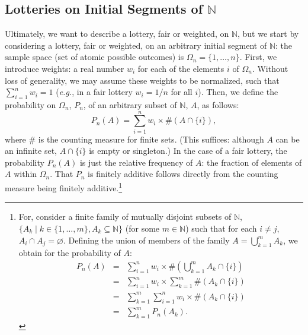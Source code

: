 \subsection{Lotteries on Initial Segments of $\mathbb{N}$}
Ultimately, we want to describe a lottery, fair or weighted, on $\mathbb{N}$, but we start by considering a lottery, fair or weighted, on an arbitrary initial segment of $\mathbb{N}$: the sample space (set of atomic possible outcomes) is $\Omega_n=\{1,\ldots,n\}$. First, we introduce weights: a real number $w_i$ for each of the elements $i$ of $\Omega_n$. Without loss of generality, we may assume these weights to be normalized, such that $\sum_{i=1}^{n} w_i=1$ (\textit{e.g.}, in a fair lottery $w_i=1/n$ for all $i$). Then, we define the probability on $\Omega_n$, $P_n$, of an arbitrary subset of $\mathbb{N}$, $A$, as follows:
$$ P_n(A)= \sum_{i=1}^{n}w_i \times \#(A \cap \{i\}), $$
where $\#$ is the counting measure for finite sets. (This suffices: although $A$ can be an infinite set, $A \cap \{i\}$ is empty or singleton.)
In the case of a fair lottery, the probability $P_n(A)$ is just the relative frequency of $A$: the fraction of elements of $A$ within $\Omega_n$.
That $P_n$ is finitely additive follows directly from the counting measure being finitely additive.\footnote{For, consider a finite family of mutually disjoint subsets of $\mathbb{N}$, $\{ A_k \mid k \in \{1,\ldots,m\}, A_k \subseteq \mathbb{N} \}$ (for some $m \in \mathbb{N}$) such that for each $i \neq j$, $A_i \cap A_j = \varnothing$. Defining the union of members of the family $A=\bigcup_{k=1}^{m}A_k$, we obtain for the probability of $A$:
$$
\begin{array}{lll}
P_n(A) & = & \sum_{i=1}^{n}w_i \times \#(\bigcup_{k=1}^{m}A_k \cap \{i\})
\\ & = & \sum_{i=1}^{n}w_i \times \sum_{k=1}^{m}\#(A_k \cap \{i\})
\\ & = & \sum_{k=1}^{m}\sum_{i=1}^{n}w_i \times \#(A_k \cap \{i\})
\\ & = & \sum_{k=1}^{m}P_n(A_k).
\end{array}
$$}

